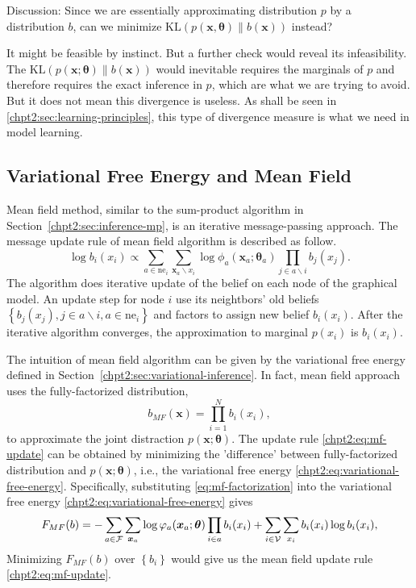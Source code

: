 \begin{remark}
  Discussion: Since we are essentially approximating distribution $p$ by a distribution $b$, can we minimize $\mathrm{KL}(p(\bm{x}, \bm{\theta})\|b(\bm{x}))$ instead?

  It might be feasible by instinct. But a further check would reveal its infeasibility. The $\mathrm{KL}(p(\bm{x}; \bm{\theta})\|b(\bm{x}))$ would inevitable requires the marginals of $p$ and therefore requires the exact inference in $p$, which are what we are trying to avoid. But it does not mean this divergence is useless. As shall be seen in \autoref{chpt2:sec:learning-principles}, this type of divergence measure is what we need in model learning.
\end{remark}



\subsection{Variational Free Energy and Mean Field}

Mean field method, similar to the sum-product algorithm in Section~\ref{chpt2:sec:inference-mp}, is an iterative message-passing approach. 
The message update rule of mean field algorithm is described as follow.
\begin{equation}\label{chpt2:eq:mf-update}
  \log{b_i(x_i)} \propto \sum_{a \in \mathrm{ne}_i} \sum_{\bm{x}_{a} \backslash x_i} \log{\phi_{a}}(\bm{x}_{a};\bm{\theta}_{a}) \prod_{j\in {a}\backslash i} b_j(x_j).
\end{equation}
The algorithm does iterative update of the belief on each node of the graphical model. An update step for node $i$ use its neightbors' old  beliefs  $\left\{ b_j(x_j), j\in {a}\backslash i, a \in \mathrm{ne}_i \right\}$ and factors to assign new belief $b_i(x_i)$. After the iterative algorithm converges, the approximation to marginal $p(x_i)$ is $b_i(x_i)$.


The intuition of mean field algorithm can be given by the variational free energy defined in Section~\ref{chpt2:sec:variational-inference}. In fact, mean field approach uses the fully-factorized distribution,
\begin{equation}\label{eq:mf-factorization}
  b_{MF}(\bm{x}) = \prod_{i=1}^{N}b_i(x_i),
\end{equation}
to approximate the joint distraction $p(\bm{x};\bm{\theta})$. The update rule \eqref{chpt2:eq:mf-update} can be obtained by minimizing the 'difference' between fully-factorized distribution and $p(\bm{x};\bm{\theta})$, i.e., the variational free energy \eqref{chpt2:eq:variational-free-energy}. Specifically,
substituting \eqref{eq:mf-factorization} into the variational free energy \eqref{chpt2:eq:variational-free-energy} gives
\begin{align}
  F_{MF}(b) =  - \sum_{a \in \mathcal{F}}\sum_{\bm{x}_{a}} \log{\varphi_{a}(\bm{x}_{a};\bm{\theta})}
  \prod_{i\in a}b_i(x_i) + \sum_{i \in \mathcal{V}} \sum_{x_i} b_i(x_i) \log{b_i(x_i)},
\end{align}
Minimizing $F_{MF}(b)$ over $\left\{ b_i \right\}$ would give us the mean field update rule \eqref{chpt2:eq:mf-update}.

